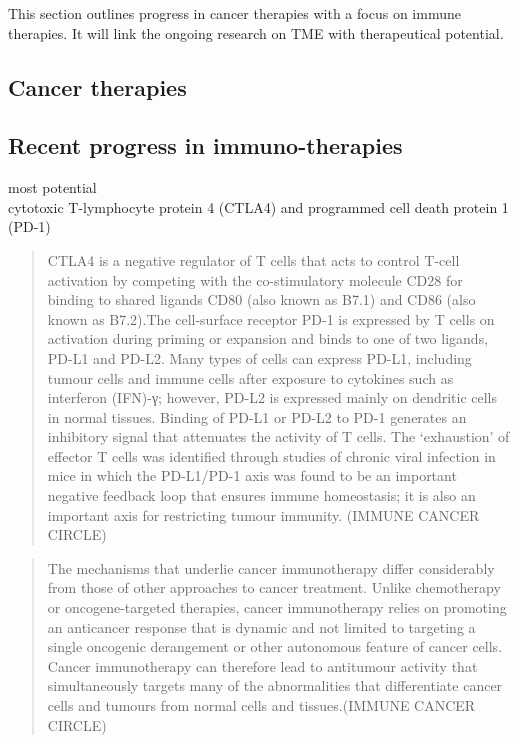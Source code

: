 \documentclass[12pt,]{book}
\theoremstyle{definition}
\theoremstyle{definition}
\theoremstyle{definition}
\theoremstyle{remark}
\begin{document}
This section outlines progress in cancer therapies with a focus on
immune therapies. It will link the ongoing research on TME with
therapeutical potential.

\hypertarget{cancer-therapies}{%
\subsection{Cancer therapies}\label{cancer-therapies}}

\hypertarget{recent-progress-in-immuno-therapies}{%
\subsection{Recent progress in
immuno-therapies}\label{recent-progress-in-immuno-therapies}}

most potential\\
cytotoxic T-lymphocyte protein 4 (CTLA4) and programmed cell death
protein 1 (PD-1)

\begin{quote}
CTLA4 is a negative regulator of T cells that acts to control T-cell
activation by competing with the co-stimulatory molecule CD28 for
binding to shared ligands CD80 (also known as B7.1) and CD86 (also known
as B7.2).The cell-surface receptor PD-1 is expressed by T cells on
activation during priming or expansion and binds to one of two ligands,
PD-L1 and PD-L2. Many types of cells can express PD-L1, including tumour
cells and immune cells after exposure to cytokines such as interferon
(IFN)-γ; however, PD-L2 is expressed mainly on dendritic cells in normal
tissues. Binding of PD-L1 or PD-L2 to PD-1 generates an inhibitory
signal that attenuates the activity of T cells. The `exhaustion' of
effector T cells was identified through studies of chronic viral
infection in mice in which the PD-L1/PD-1 axis was found to be an
important negative feedback loop that ensures immune homeostasis; it is
also an important axis for restricting tumour immunity. (IMMUNE CANCER
CIRCLE)
\end{quote}

\begin{quote}
The mechanisms that underlie cancer immunotherapy differ considerably
from those of other approaches to cancer treatment. Unlike chemotherapy
or oncogene-targeted therapies, cancer immunotherapy relies on promoting
an anticancer response that is dynamic and not limited to targeting a
single oncogenic derangement or other autonomous feature of cancer
cells. Cancer immunotherapy can therefore lead to antitumour activity
that simultaneously targets many of the abnormalities that differentiate
cancer cells and tumours from normal cells and tissues.(IMMUNE CANCER
CIRCLE)
\end{quote}
\end{document}
